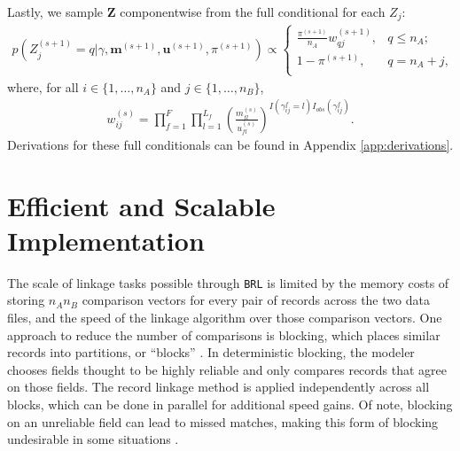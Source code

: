 \documentclass[ba]{imsart}
\begin{document}
Lastly, we sample $\bm{Z}$ componentwise from the full conditional for each $Z_j$:
\begin{align}
	\label{eqn:z_full_conditional}
	p\left(Z_j^{(s+1)}  = q|\gamma, \bm{m}^{(s+1)}, \bm{u}^{(s+1)},  \pi^{(s+1)}\right) \propto
	\begin{cases} 
		\frac{\pi^{(s+1)}}{n_A} w_{qj}^{(s+1)},  & q \leq n_A; \\
		1 - \pi^{(s+1)}, & q  = n_A + j, \\
	\end{cases}
\end{align}
where, for all $i \in \{1, \ldots, n_A\}$ and $j \in \{1, \ldots, n_B\}$, 
\begin{align}
	\label{eqn:fs_weight}
	w_{ij}^{(s)} = \prod_{f=1}^{F}\prod_{l = 1}^{L_f} \left(\frac{m_{fl}^{(s)}}{u_{fl}^{(s)}}\right)^{I(\gamma_{ij}^f = l)I_{obs}(\gamma_{ij}^f)}.
\end{align}
Derivations for these full conditionals can be found in Appendix \ref{app:derivations}.

\section{Efficient and Scalable Implementation}
\label{sec:efficiency}

The scale of linkage tasks possible through \texttt{BRL} is limited by the memory costs of storing $n_A  n_B$ comparison vectors for every pair of records across the two data files, and the speed of the linkage algorithm over those comparison vectors. One approach to reduce the number of comparisons is blocking, which places similar records into partitions, or ``blocks'' \citep{christen2019data}. In deterministic blocking, the modeler chooses fields thought to be highly reliable and only compares records that agree on those fields. The record linkage method is  applied independently across all blocks, which can be done in parallel for additional speed gains. Of note, blocking on an unreliable field can lead to missed matches, making this form of blocking undesirable in some situations \citep{steorts_comparison_2014}.
\end{document}
